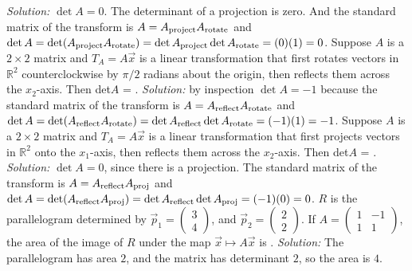 \begin{parts}
        \ifnum {} {\color{DarkBlue} \textit{Solution:}  $\det A = 0$. The determinant of a projection is zero. And the standard matrix of the transform is $A = A_{\textup{project}}A_{\textup{rotate}}$ and $\det A = \det (A_{\textup{project}}A_{\textup{rotate}}) = \det A_{\textup{project}} \det A_{\textup{rotate}}  = (0)(1) = 0$.} \fi    
    \fi 
    \ifnum {}
        Suppose $A$ is a $2\times 2$ matrix and $T_A = A\vec x$ is a linear transformation that first rotates vectors in $\mathbb R^2$ counterclockwise by $\pi/2$ radians about the origin, then reflects them across the $x_2$-axis. Then det$A$ = \framebox{\strut\hspace{1cm}}.
        \ifnum {} {\color{DarkBlue} \textit{Solution:} by inspection $\det A = -1$ because the standard matrix of the transform is $A = A_{\textup{reflect}}A_{\textup{rotate}}$ and $\det A = \det (A_{\textup{reflect}}A_{\textup{rotate}}) = \det A_{\textup{reflect}} \det A_{\textup{rotate}} = (-1)(1) = -1$.} \fi    
    \fi 
    \ifnum {}
        Suppose $A$ is a $2\times 2$ matrix and $T_A = A\vec x$ is a linear transformation that first projects vectors in $\mathbb R^2$ onto the $x_1$-axis, then reflects them across the $x_2$-axis. Then det$A$ = \framebox{\strut\hspace{1cm}}.
        \ifnum {} {\color{DarkBlue} \textit{Solution:}  $\det A = 0$, since there is a projection. The standard matrix of the transform is $A = A_{\textup{reflect}}A_{\textup{proj}}$ and $\det A = \det (A_{\textup{reflect}}A_{\textup{proj}}) = \det A_{\textup{reflect}} \det A_{\textup{proj}} = (-1)(0) = 0$.}\fi    
    \fi 
    \ifnum {}
        $R$ is the parallelogram determined by $\vec p_1 = \begin{pmatrix}3\\4 \end{pmatrix}$, and $\vec p_2 = \begin{pmatrix} 2\\2\end{pmatrix}$.  If $A = \begin{pmatrix} 1&-1\\1&1\end{pmatrix}$, the area of the image of $R$ under the map $ \vec x\mapsto A\vec x$ is \framebox{\strut\hspace{1cm}}.
        \ifnum {} {\color{DarkBlue} \textit{Solution:} 
        The parallelogram has area $2$, and the matrix has determinant $2$, so the area is $4$.} \fi    
    \fi 
    \ifnum {}

\end{parts}
